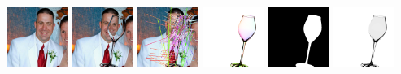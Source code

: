      \\
     \includegraphics[width=0.15\textwidth]{ch-tomnet/images/Dataset/render_gt_shape003_COCO_val2014_000000366529_ref}
     \includegraphics[width=0.15\textwidth]{ch-tomnet/images/Dataset/render_gt_shape003_COCO_val2014_000000366529}
     \includegraphics[width=0.15\textwidth]{ch-tomnet/images/Dataset/render_gt_shape003_COCO_val2014_000000366529_cores}
     \includegraphics[width=0.15\textwidth]{ch-tomnet/images/Dataset/render_gt_shape003_COCO_val2014_000000366529_flow}
     \includegraphics[width=0.15\textwidth]{ch-tomnet/images/Dataset/render_gt_shape003_COCO_val2014_000000366529_mask}
     \includegraphics[width=0.15\textwidth]{ch-tomnet/images/Dataset/render_gt_shape003_COCO_val2014_000000366529_rho}
